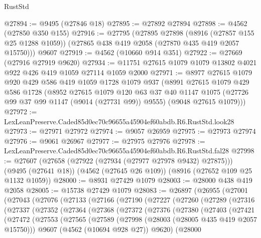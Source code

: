 \begin{lexlean}{RustStd}
\begin{coremodule}
@27894 := @9495 (@27846 @18)
@27895 := @27892 @27894
@27898 := @4562 (@27850 @350 @155)
@27916 := @27795
    (@27895
      @27898
      (@8916 (@27857 @155 @25 @1288 @1059))
      (@27865 @438 @419 @2058 (@27870 @435 @419 @2057 @15750)))
    @9607
@27919 := @4562 (@10660 @914 @351)
@27922 := @27669 (@27916 @27919 @9620)
@27934 := @11751 @27615 @1079 @1079 @13802 @4021 @922 @426 @419 @1059 @27114 @1059 @2000
@27971 := @8977
    @27615
    @1079
    @920
    @429
    @586
    @419
    @1059
    @1728
    @1079
    @937
    (@8991
      @27615
      @1079
      @429
      @586
      @1728
      (@8952
        @27615
        @1079
        @120
        @63
        @37
        @40
        @1147
        @1075
        (@27726 @99 @37 @99 @1147 (@9014 (@27731 @99)) @9555)
        (@9048 @27615 @1079)))
@27972 := LexLeanPreserve.Caded85d0ec70c96655a45904ef60abdb.R6.RustStd.look28
@27973 := @27971 @27972
@27974 := @9057 @26959
@27975 := @27973 @27974
@27976 := @9061 @26967
@27977 := @27975 @27976
@27978 := LexLeanPreserve.Caded85d0ec70c96655a45904ef60abdb.R6.RustStd.fal28
@27998 := @27607
    (@27658 (@27922 (@27934 (@27977 @27978 @9432) @27875)))
    (@9495 (@27641 @18))
    (@4562 (@27645 @26 @109))
    (@8916 (@27652 @109 @25 @1132 @1059))
@28000 := @8931 @27429 @1079
@28003 := @28000 @438 @419 @2058
@28005 := @15738 @27429 @1079
@28083 := @26897
    (@26955
      (@27001
        (@27043
          (@27076
            (@27133
              (@27166
                (@27190
                  (@27227
                    (@27260
                      (@27289
                        (@27316
                          (@27337
                            (@27352
                              (@27364
                                (@27368
                                  (@27372
                                    (@27376
                                      (@27380
                                        (@27403
                                          (@27421
                                            (@27472
                                              (@27553
                                                (@27565
                                                  (@27589
                                                    (@27998
                                                      (@28003 (@28005 @435 @419 @2057 @15750)))
                                                    @9607
                                                    (@4562 (@10694 @928 @27))
                                                    @9620)
                                                  (@28000

\end{coremodule}
\end{lexlean}
